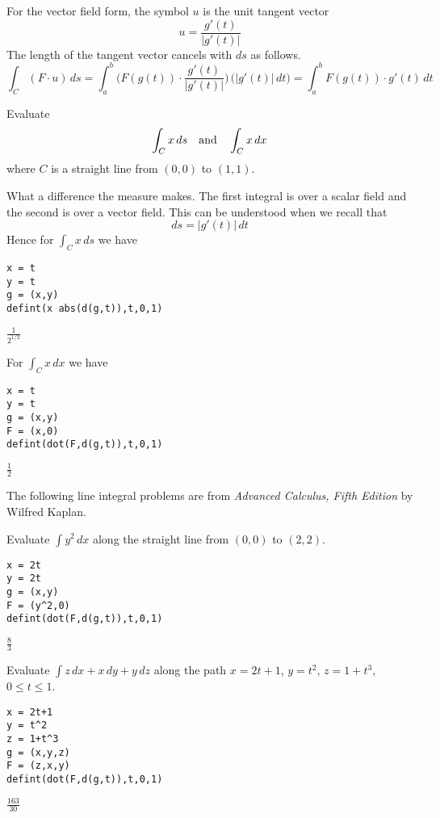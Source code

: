 \noindent
For the vector field form, the symbol $u$ is the unit tangent vector
$$u=\frac{g'(t)}{|g'(t)|}$$
The length of the tangent vector cancels with $ds$
as follows.
$$\int_C(F\cdot u)\,ds
=\int_a^b\bigg(F(g(t))\cdot\frac{g'(t)}{|g'(t)|}\bigg)\,\bigg(|g'(t)|\,dt\bigg)
=\int_a^b F(g(t))\cdot g'(t)\,dt
$$

\noindent
Evaluate
$$\int_Cx\,ds\quad\hbox{and}\quad\int_Cx\,dx$$
where $C$ is a straight line from $(0,0)$ to $(1,1)$.

\bigskip
\noindent
What a difference the measure makes.
The first integral is over a scalar field and the second is over a vector field.
This can be understood when we recall that
$$ds=|g'(t)|\,dt
$$
Hence for $\int_Cx\,ds$ we have

{\color{blue}
\begin{verbatim}
x = t
y = t
g = (x,y)
defint(x abs(d(g,t)),t,0,1)
\end{verbatim}
}

\noindent
$\displaystyle \frac{1}{2^{1/2}}$

\bigskip
\noindent
For $\int_Cx\,dx$ we have

{\color{blue}
\begin{verbatim}
x = t
y = t
g = (x,y)
F = (x,0)
defint(dot(F,d(g,t)),t,0,1)
\end{verbatim}
}

\noindent
$\displaystyle \tfrac{1}{2}$

\bigskip
\noindent
The following line integral problems are from
{\it Advanced Calculus, Fifth Edition} by Wilfred Kaplan.

\bigskip
\noindent
Evaluate $\int y^2\,dx$ along the straight
line from $(0,0)$ to $(2,2)$.

{\color{blue}
\begin{verbatim}
x = 2t
y = 2t
g = (x,y)
F = (y^2,0)
defint(dot(F,d(g,t)),t,0,1)
\end{verbatim}
}

\noindent
$\displaystyle \tfrac{8}{3}$

\bigskip
\noindent
Evaluate $\int z\,dx+x\,dy+y\,dz$
along the path
$x=2t+1$, $y=t^2$, $z=1+t^3$, $0\le t\le 1$.

{\color{blue}
\begin{verbatim}
x = 2t+1
y = t^2
z = 1+t^3
g = (x,y,z)
F = (z,x,y)
defint(dot(F,d(g,t)),t,0,1)
\end{verbatim}
}

\noindent
$\displaystyle \tfrac{163}{30}$
